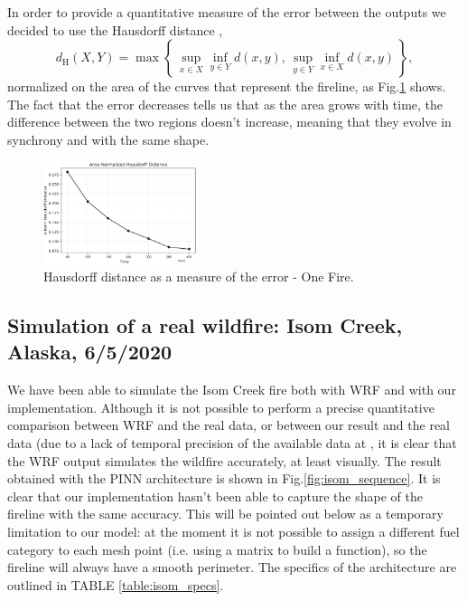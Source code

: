 \documentclass{juliacon}
\begin{document}
In order to provide a quantitative measure of the error between the outputs we decided to use the Hausdorff distance \cite{Knauer},
\begin{displaymath}
    d_{\mathrm H}(X,Y) = \max\left\{\,\sup_{x \in X} \inf_{y \in Y} d(x,y),\, \sup_{y \in Y} \inf_{x \in X} d(x,y)\,\right\},
\end{displaymath}
normalized on the area of the curves that represent the fireline, as Fig.\ref{fig:hausdorff_one_fire} shows. The fact that the error decreases tells us that as the area grows with time, the difference between the two regions doesn't increase, meaning that they evolve in synchrony and with the same shape.


\begin{figure}[t]
\centering
\includegraphics[width=0.4\textwidth]{images/Hausdorff/norm_area_hausdorff_one_fire2.pdf}
\caption{Hausdorff distance as a measure of the error - One Fire.}
\label{fig:hausdorff_one_fire}
\end{figure}


\subsection{Simulation of a real wildfire: Isom Creek, Alaska, 6/5/2020}

We have been able to simulate the Isom Creek fire \cite{isom_creek_info} both with WRF and with our implementation. Although it is not possible to perform a precise quantitative comparison between WRF and the real data, or between our result and the real data (due to a lack of temporal precision of the available data at \cite{isom_creek_map}, it is clear that the WRF output simulates the wildfire accurately, at least visually.
The result obtained with the PINN architecture is shown in Fig.\ref{fig:isom_sequence}.
It is clear that our implementation hasn't been able to capture the shape of the fireline with the same accuracy. This will be pointed out below as a temporary limitation to our model: at the moment it is not possible to assign a different fuel category to each mesh point (i.e. using a matrix to build a function), so the fireline will always have a smooth perimeter.
The specifics of the architecture are outlined in TABLE \ref{table:isom_specs}.
\end{document}
